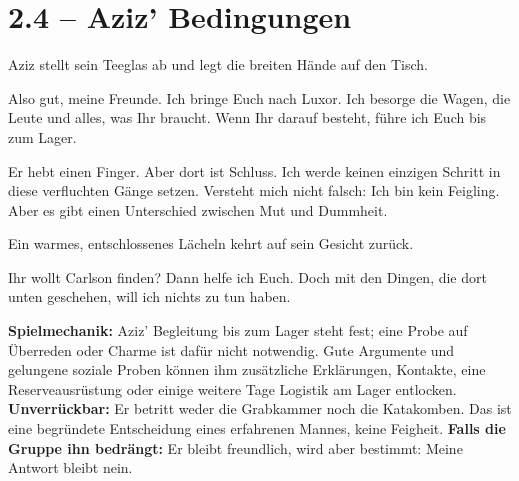 \section{2.4 -- Aziz' Bedingungen}
\begin{vorlesetextalle}
Aziz stellt sein Teeglas ab und legt die breiten Hände auf den Tisch.

\glqq{}Also gut, meine Freunde. Ich bringe Euch nach Luxor. Ich besorge die Wagen, die Leute und alles, was Ihr braucht. Wenn Ihr darauf besteht, führe ich Euch bis zum Lager.\grqq{}

Er hebt einen Finger. \glqq{}Aber dort ist Schluss. Ich werde keinen einzigen Schritt in diese verfluchten Gänge setzen. Versteht mich nicht falsch: Ich bin kein Feigling. Aber es gibt einen Unterschied zwischen Mut und Dummheit.\grqq{}

Ein warmes, entschlossenes Lächeln kehrt auf sein Gesicht zurück.

\glqq{}Ihr wollt Carlson finden? Dann helfe ich Euch. Doch mit den Dingen, die dort unten geschehen, will ich nichts zu tun haben.\grqq{}
\end{vorlesetextalle}
\begin{meisterinfo}
\textbf{Spielmechanik:} Aziz' Begleitung bis zum Lager steht fest; eine Probe auf Überreden oder Charme ist dafür nicht notwendig. Gute Argumente und gelungene soziale Proben können ihm zusätzliche Erklärungen, Kontakte, eine Reserveausrüstung oder einige weitere Tage Logistik am Lager entlocken. \textbf{Unverrückbar:} Er betritt weder die Grabkammer noch die Katakomben. Das ist eine begründete Entscheidung eines erfahrenen Mannes, keine Feigheit. \textbf{Falls die Gruppe ihn bedrängt:} Er bleibt freundlich, wird aber bestimmt: \glqq{}Meine Antwort bleibt nein.\grqq{}
\end{meisterinfo}

